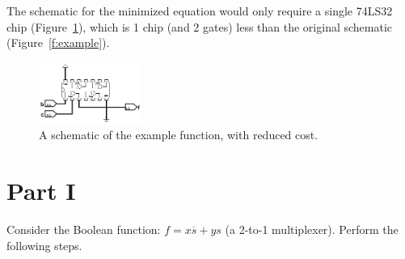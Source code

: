 \documentclass{article}
\begin{document}
\begin{enumerate}
The schematic for the minimized equation would only require a single 74LS32 chip (Figure~\ref{f:example_reduced}), which is 1 chip (and 2 gates) less than the original schematic (Figure~\ref{f:example}).

\begin{figure}[!ht]
    \centering
    \includegraphics[width=0.3\textwidth]{example_reduced.png}
    \caption{A schematic of the example function, with reduced cost.}
    \label{f:example_reduced}
\end{figure}
\end{enumerate}

\newpage
\section*{Part I}

Consider the Boolean function: $f = x\overline{s}+ys$ (a 2-to-1 multiplexer).
Perform the following steps.
\end{document}
